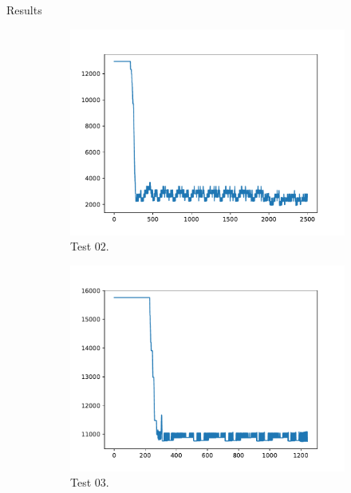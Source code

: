 \begin{section}{Results}
\begin{figure}
\begin{subfigure}{0.45\textwidth}
         \includegraphics[width=\textwidth]{../logs/test02.pdf}
         \caption{Test $02$.}
     \end{subfigure}
     \begin{subfigure}{0.45\textwidth}
         \includegraphics[width=\textwidth]{../logs/test03.pdf}
         \caption{Test $03$.}
     \end{subfigure}
     \begin{subfigure}{0.45\textwidth}

\end{subfigure}
\end{figure}
\end{section}
